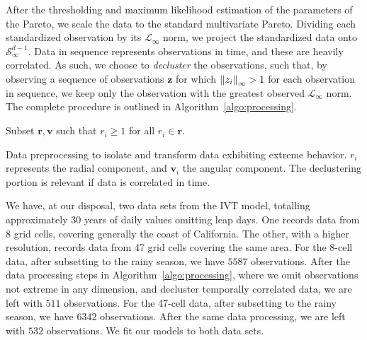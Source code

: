 After the thresholding and maximum likelihood estimation of the parameters of the Pareto, we scale
  the data to the standard multivariate Pareto.  Dividing each standardized observation by its
  $\mathcal{L}_{\infty}$ norm, we project the standardized data onto $\mathcal{S}_{\infty}^{d-1}$.
  Data in sequence represents observations in time, and these are heavily correlated.  As such, we
  choose to \emph{decluster} the observations, such that, by observing a sequence of observations
  $\bm{ z}$ for which $\inorm{z_i} > 1$ for each observation in sequence, we keep only the observation
  with the greatest observed $\mathcal{L}_{\infty}$ norm.  The complete procedure is outlined in
  Algorithm~\ref{algo:processing}.

\begin{algorithm}
  Subset $\bm{ r},\bm{ v}$ such that $r_i \geq 1$ for all $r_i\in \bm{r}$.\\
 \caption{Data preprocessing to isolate and transform data exhibiting extreme behavior.  $r_i$
   represents the radial component, and $\bm{v}_i$ the angular component.  The declustering
   portion is relevant if data is correlated in time.\label{algo:processing}}
\end{algorithm}

We have, at our disposal, two data sets from the IVT model, totalling approximately 30 years of daily
  values omitting leap days.  One records data from 8 grid cells, covering
  generally the coast of California.  The other, with a higher resolution, records data from 47 grid
  cells covering the same area.  For the 8-cell data, after subsetting to the rainy season, we have
  $5587$ observations.  After the data processing steps in Algorithm~\ref{algo:processing}, where we
  omit observations not extreme in any dimension, and decluster temporally correlated data, we are left
  with $511$ observations.  For the 47-cell data, after subsetting to the rainy season, we have $6342$
  observations.  After the same data processing, we are left with
  $532$ observations.  We fit our models to both data sets.


